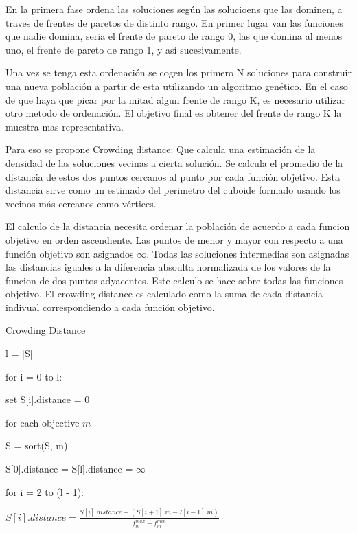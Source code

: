 En la primera fase ordena las soluciones seg\'un las solucioens que las dominen, a traves de frentes de paretos de distinto rango. En primer lugar van las funciones que nadie domina, seria el frente de pareto de rango 0, las que domina al menos uno, el frente de pareto de rango 1, y as\'i sucesivamente.

Una vez se tenga esta ordenaci\'on se cogen los primero N soluciones para construir una nueva poblaci\'on a partir de esta utilizando un algoritmo gen\'etico. En el caso de que haya que picar por la mitad algun frente de rango K, es necesario utilizar otro metodo de ordenaci\'on. El objetivo final es obtener del frente de rango K la muestra mas representativa.

Para eso se propone Crowding distance:
Que calcula una estimaci\'on de la densidad de las soluciones vecinas a cierta soluci\'on. Se calcula el promedio de la distancia de estos dos puntos cercanos al punto por cada funci\'on objetivo. Esta distancia sirve como un estimado del perimetro del cuboide formado usando los vecinos m\'as cercanos como v\'ertices. 

El calculo de la distancia necesita ordenar la poblaci\'on de acuerdo a cada funcion objetivo en orden ascendiente. Las puntos de menor y mayor con respecto a una funci\'on objetivo son asignados $\infty$. Todas las soluciones intermedias son asignadas las distancias iguales a la diferencia absoulta normalizada de los valores de la funcion de dos puntos adyacentes. Este calculo se hace sobre todas las funciones objetivo. El crowding distance es calculado como la suma de cada distancia indivual correspondiendo a cada funci\'on objetivo.

\begin{algorithm*}\caption{Crowding Distance}
    l = |S|

    for i = 0 to l:

    \quad set S[i].distance = 0

    for each objective $m$

    \quad S = sort(S, m)

    \quad S[0].distance = S[l].distance = $\infty$

    \quad for i = 2 to (l - 1):

    \qquad 
    \begin{math}
        S[i].distance  = \frac{S[i].distance + (S[i + 1].m - I[i - 1].m)}{f^{max}_{m} - f^{min}_m}
    \end{math}
\end{algorithm*}


